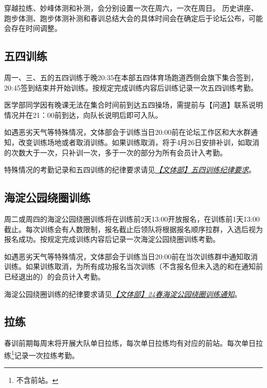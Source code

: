 \documentclass[UTF8]{ctexart}
\begin{document}
\begin{table}[h]
{\begin{tabular}
    \end{tabular}%
    }
\end{table}

穿越拉练、妙峰体测和补测，会分别设置一次在周六，一次在周日。
历史讲座、跑步体测、跑步体测补测和春训总结大会的具体时间会在确定后于论坛公布，可能会存在时间调整。

\subsection{五四训练}

周一、三、五的五四训练于晚20:35在本部五四体育场跑道西侧会旗下集合签到，20:45签到结束并开始训练。按规定完成训练内容后训练记录一次五四训练考勤。

医学部同学因有晚课无法在集合时间前到达五四操场，需提前与【问道】联系说明情况并在21：00前到达，向队长说明后即可入队。

如遇恶劣天气等特殊情况，文体部会于训练当日20:00前在论坛工作区和大水群通知，改变训练场地或者取消训练。如果训练取消，将于4月26日安排补训，如取消的次数大于一次，只补训一次，多于一次的部分为所有会员计入考勤。

特殊情况的考勤记录和五四训练的纪律要求请见\href{https://chexie.net/bbs/content/index.php?bid=1\&tid=9576\&p=1}{\textit{【文体部】五四训练纪律要求}}。


\subsection{海淀公园绕圈训练}

周二或周四的海淀公园绕圈训练将在训练前2天13:00开放报名，在训练前1天13:00截止。每次训练会有人数限制，报名截止后领队将根据报名顺序拉群，入选后视为报名成功。按规定完成训练内容后记录一次海淀公园绕圈训练考勤。

如遇恶劣天气等特殊情况，文体部会于训练当日20:00前在当次训练群中通知取消训练。如果训练取消，为所有成功报名当次训练（不含报名但未入选的和在通知前已经退出的）的会员计入考勤。

海淀公园绕圈训练的纪律要求请见\href{https://chexie.net/bbs/content/?bid=1&tid=9743&p=1}{\textit{【文体部】24春海淀公园绕圈训练通知}}。

\subsection{拉练}

春训前期每周末将开展大队单日拉练，每次单日拉练均有对应的前站。每次单日拉练\footnote{不含前站。}记录一次拉练考勤。
\end{document}

